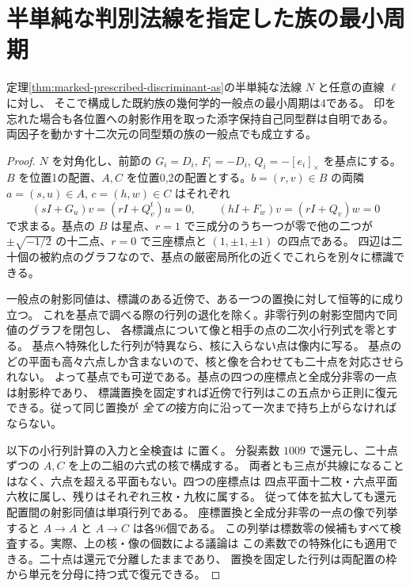 \section{半単純な判別法線を指定した族の最小周期}
\label{sec:marked-semisimple-period}
\begin{theorem}\label{thm:marked-semisimple-period}
定理\ref{thm:marked-prescribed-discriminant-as}の半単純な法線 $N$ と任意の直線 $\ell$ に対し、
そこで構成した既約族の幾何学的一般点の最小周期は4である。
印を忘れた場合も各位置への射影作用を取った添字保持自己同型群は自明である。
両因子を動かす十二次元の同型類の族の一般点でも成立する。
\end{theorem}
\begin{proof}
$N$ を対角化し、前節の $G_i=D_i$, $F_i=-D_i$, $Q_i=-[e_i]_\times$ を基点にする。
$B$ を位置1の配置、$A,C$ を位置0,2の配置とする。$b=(r,v)\in B$ の両隣
$a=(s,u)\in A$, $c=(h,w)\in C$ はそれぞれ
\[
 (sI+G_u)v=(rI+Q_v^t)u=0,\qquad
 (hI+F_w)v=(rI+Q_v)w=0
\]
で求まる。基点の $B$ は星点、$r=1$ で三成分のうち一つが零で他の二つが
$\pm\sqrt{-1/2}$ の十二点、$r=0$ で三座標点と $(1,\pm1,\pm1)$ の四点である。
四辺は二十個の被約点のグラフなので、基点の厳密局所化の近くでこれらを別々に標識できる。

一般点の射影同値は、標識のある近傍で、ある一つの置換に対して恒等的に成り立つ。
これを基点で調べる際の行列の退化を除く。非零行列の射影空間内で同値のグラフを閉包し、
各標識点について像と相手の点の二次小行列式を零とする。
基点へ特殊化した行列が特異なら、核に入らない点は像内に写る。
基点のどの平面も高々六点しか含まないので、核と像を合わせても二十点を対応させられない。
よって基点でも可逆である。基点の四つの座標点と全成分非零の一点は射影枠であり、
標識置換を固定すれば近傍で行列はこの五点から正則に復元できる。従って同じ置換が
\emph{全ての}接方向に沿って一次まで持ち上がらなければならない。

以下の小行列計算の入力と全検査は
に置く。
分裂素数 $1009$ で還元し、二十点ずつの $A,C$ を上の二組の六式の核で構成する。
両者とも三点が共線になることはなく、六点を超える平面もない。四つの座標点は
四点平面十二枚・六点平面六枚に属し、残りはそれぞれ三枚・九枚に属する。
従って体を拡大しても還元配置間の射影同値は単項行列である。
座標置換と全成分非零の一点の像で列挙すると $A\to A$ と $A\to C$ は各96個である。
この列挙は標数零の候補もすべて検査する。実際、上の核・像の個数による議論は
この素数での特殊化にも適用できる。二十点は還元で分離したままであり、
置換を固定した行列は両配置の枠から単元を分母に持つ式で復元できる。


\end{proof}
